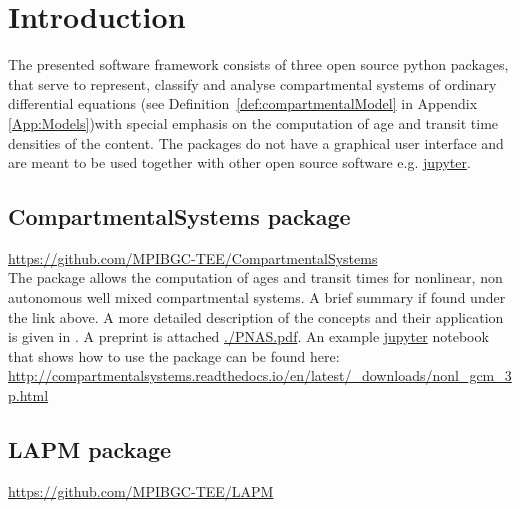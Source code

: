 \documentclass[a4paper]{article}
\DeclareRobustCommand{\Defref}[1]{\mbox{Definition \ref{#1}}}
\DeclareRobustCommand{\Appendixref}[1]{Appendix \ref{#1}}
\begin{document}
\section{Introduction}
The presented software framework consists of three open source python packages, 
that serve to represent, classify and analyse compartmental systems of ordinary differential equations (see \Defref{def:compartmentalModel} in \Appendixref{App:Models})with special emphasis on the computation of age and transit time densities of the content.  
The packages do not have a graphical user interface and are meant to be used together with other open source software e.g. \href{jupyter.org}{jupyter}. 

\subsection{CompartmentalSystems package}
\url{https://github.com/MPIBGC-TEE/CompartmentalSystems}\\
The package allows the computation of ages and transit times for nonlinear, non autonomous well mixed compartmental systems.
A brief summary if found under the link above. A more detailed description of the concepts and their application is given in \citet[]{MetzlerMuellerSierra2018PNAS}. A preprint is attached \url{./PNAS.pdf}.
An example \href{jupyter.org}{jupyter} notebook that shows how to use the package can be found here:
\url{http://compartmentalsystems.readthedocs.io/en/latest/_downloads/nonl_gcm_3p.html}

\subsection{LAPM package}
\url{https://github.com/MPIBGC-TEE/LAPM}\\
\end{document}
